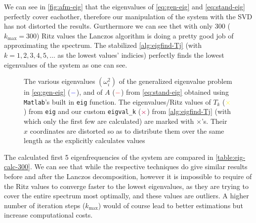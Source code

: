 \documentclass{article}
\begin{document}
We can see in \autoref{fig:afm-eig} that the eigenvalues of \autoref{eq:gen-eig} and \autoref{eq:stand-eig} perfectly cover eachother, therefore our manipulation of the system with the SVD has not distorted the results. Gurthermore we can see thet with only 300 ($k_{\mathrm{max}}= 300$) Ritz values the Lanczos algorithm is doing a pretty good job of approximating the spectrum. The stabilized \autoref{alg:eigfind-Tj} (with $k=1,2,3,4,5,\dots$ as the lowest values' indicies) perfectly finds the lowest eigenvalues of the system as one can see.
\begin{figure}[h!]
	\centering
	\resizebox{0.8\textwidth}{!}{
		}
	\caption{The various eigenvalues $\left(\omega_i^2\right)$ of the generalized eigenvalue problem in \autoref{eq:gen-eig} (${\color{blue}-}$), and of $A$ (${\color{red}-}$) from \autoref{eq:stand-eig} obtained using \texttt{Matlab}'s built in \texttt{eig} function. The eigenvalues/Ritz values of $T_k$ (${\color{yellow}\times}$) from \texttt{eig} and our custom \texttt{eigval\_k} (${\color{purple}\times}$) from \autoref{alg:eigfind-Tj} (with which only the first few are calculated) are marked with $\times$'s. Their $x$ coordinates are distorted so as to distribute them over the same length as the explicitly calculates values }\label{fig:afm-eig}
\end{figure}

The calculated first 5 eigenfrequencies of the system are compared in \autoref{table:eig-calc-300}. We can see that while the respective techniques do give similar results before and after the Lanczos decomposition, however it is impossible to require of the Ritz values to converge faster to the lowest eigenvalues, as they are trying to cover the entire spectrum most optimally, and these values are outliers. A higher number of iteration steps ($k_{\mathrm{max}}$) would of course lead to better estimations but increase computational costs.
\end{document}
